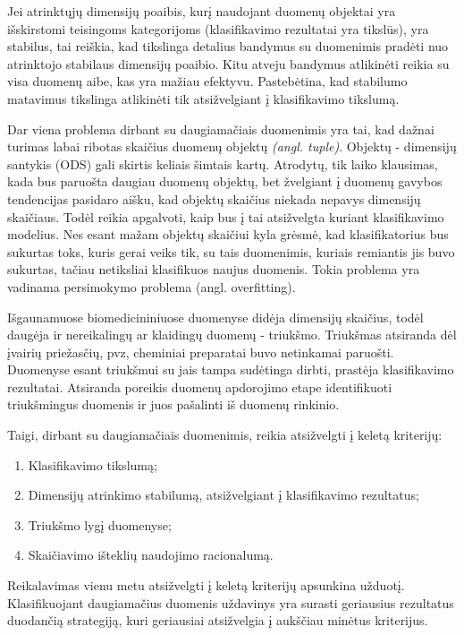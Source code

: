 Jei atrinktųjų dimensijų poaibis, kurį naudojant duomenų objektai yra išskirstomi
teisingoms kategorijoms (klasifikavimo rezultatai yra tikslūs),
yra stabilus, tai reiškia, kad tikslinga detalius bandymus su duomenimis 
pradėti nuo atrinktojo stabilaus dimensijų poaibio. Kitu atveju bandymus 
atlikinėti reikia su visa duomenų aibe, kas yra mažiau efektyvu. Pastebėtina, kad
stabilumo matavimus tikslinga atlikinėti tik atsižvelgiant į klasifikavimo
tikslumą.

Dar viena problema dirbant su daugiamačiais duomenimis yra tai, kad dažnai
turimas labai ribotas skaičius duomenų objektų \textit{(angl. tuple)}. 
Objektų - dimensijų santykis (ODS) gali skirtis keliais šimtais kartų. 
Atrodytų, tik laiko klausimas, kada bus paruošta
daugiau duomenų objektų, bet žvelgiant į duomenų gavybos tendencijas pasidaro
aišku, kad
objektų skaičius niekada nepavys dimensijų skaičiaus. Todėl reikia apgalvoti,
kaip bus į tai atsižvelgta kuriant klasifikavimo modelius. Nes esant mažam
objektų skaičiui kyla grėsmė, kad klasifikatorius bus sukurtas toks, kuris
gerai veiks tik, su tais duomenimis, kuriais remiantis jis buvo sukurtas, 
tačiau netiksliai klasifikuos naujus duomenis. Tokia problema yra vadinama 
persimokymo problema (angl. overfitting).

Išgaunamuose biomedicininiuose duomenyse didėja dimensijų skaičius, todėl 
daugėja ir nereikalingų ar klaidingų duomenų - triukšmo. Triukšmas atsiranda
dėl įvairių priežasčių, pvz, cheminiai preparatai buvo netinkamai paruošti. 
Duomenyse esant triukšmui su jais tampa sudėtinga dirbti, prastėja klasifikavimo
rezultatai. Atsiranda poreikis duomenų apdorojimo etape identifikuoti 
triukšmingus duomenis ir juos pašalinti iš duomenų rinkinio.

Taigi, dirbant su daugiamačiais duomenimis, reikia atsižvelgti į keletą 
kriterijų:
\begin{enumerate}
 \item Klasifikavimo tikslumą;
 \item Dimensijų atrinkimo stabilumą, atsižvelgiant į klasifikavimo rezultatus;
 \item Triukšmo lygį duomenyse;
 \item Skaičiavimo išteklių naudojimo racionalumą.
\end{enumerate}
Reikalavimas vienu metu atsižvelgti į keletą kriterijų apsunkina užduotį.
Klasifikuojant daugiamačius duomenis uždavinys yra surasti geriausius 
rezultatus duodančią strategiją, kuri geriausiai atsižvelgia į aukščiau minėtus
kriterijus.

